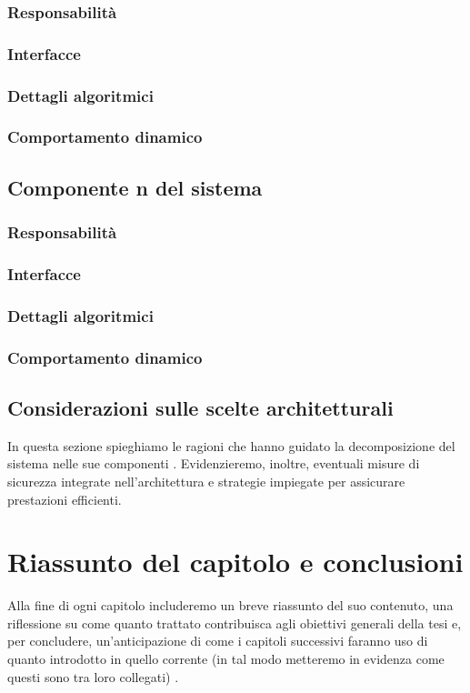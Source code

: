 \subsubsection{Responsabilità}

\subsubsection{Interfacce}

\subsubsection{Dettagli algoritmici}

\subsubsection{Comportamento dinamico}

\subsection{Componente n del sistema}

\subsubsection{Responsabilità}

\subsubsection{Interfacce}

\subsubsection{Dettagli algoritmici}

\subsubsection{Comportamento dinamico}

\subsection{Considerazioni sulle scelte architetturali}

In questa sezione spieghiamo le ragioni che hanno guidato la decomposizione del sistema nelle sue componenti \cite{harran2023design}. Evidenzieremo, inoltre, eventuali misure di sicurezza integrate nell'architettura e strategie impiegate per assicurare prestazioni efficienti.

\section{Riassunto del capitolo e conclusioni}

Alla fine di ogni capitolo includeremo un breve riassunto del suo contenuto, una riflessione su come quanto trattato contribuisca agli obiettivi generali della tesi e, per concludere, un'anticipazione di come i capitoli successivi faranno uso di quanto introdotto in quello corrente (in tal modo metteremo in evidenza come questi sono tra loro collegati) \cite{zobel2015writing}.